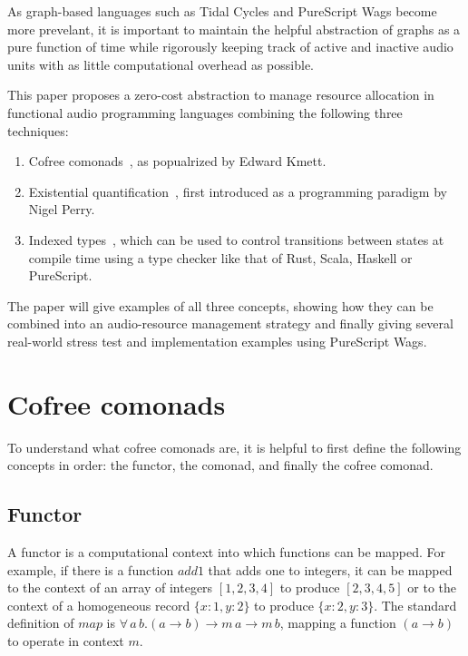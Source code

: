 \documentclass{article}
\begin{document}
As graph-based languages such as Tidal Cycles and PureScript Wags become more prevelant, it is important to maintain the helpful abstraction of graphs as a pure function of time while rigorously keeping track of active and inactive audio units with as little computational overhead as possible.

This paper proposes a zero-cost abstraction to manage resource allocation in functional audio programming languages combining the following three techniques:

\begin{enumerate}
  \item Cofree comonads~\cite{kmettfree, freeman2017declarative}, as popualrized by Edward Kmett.
  \item Existential quantification~\cite{perry1991implementation, laufer1994polymorphic}, first introduced as a programming paradigm by Nigel Perry.
  \item Indexed types~\cite{zenger1997indexed}, which can be used to control transitions between states at compile time using a type checker like that of Rust, Scala, Haskell or PureScript.
\end{enumerate}

The paper will give examples of all three concepts, showing how they can be combined into an audio-resource management strategy and finally giving several real-world stress test and implementation examples using PureScript Wags.

\section{Cofree comonads}
\label{sec:cofree_comonads}

To understand what cofree comonads are, it is helpful to first define the following concepts in order: the functor, the comonad, and finally the cofree comonad.

\subsection{Functor}

A functor is a computational context into which functions can be mapped. For example, if there is a function $add1$ that adds one to integers, it can be mapped to the context of an array of integers $[1,2,3,4]$ to produce $[2,3,4,5]$ or to the context of a homogeneous record $\{x:1,y:2\}$ to produce $\{x:2,y:3\}$. The standard definition of $map$ is
$\forall\,a\, b. (a \rightarrow b) \rightarrow m\,a \rightarrow m\,b$, mapping a function $(a \rightarrow b)$ to operate in context $m$.
\end{document}
